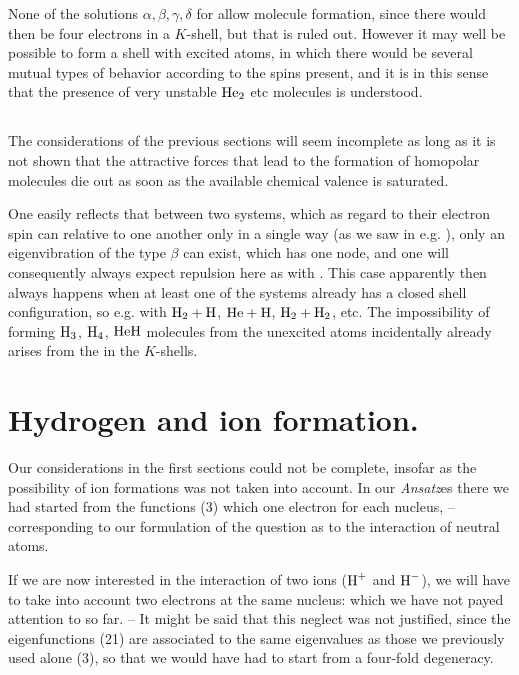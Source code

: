 \begin{paper}{1}
None of the solutions $\alpha,\beta, \gamma, \delta$ for  allow molecule formation, since there would then be four electrons in a $K$-shell, but that is ruled out. However it may well be possible to form a  shell with excited  atoms, in which there would be several mutual types of behavior according to the spins present, and it is in this sense that the presence of very unstable $\text{He}_2$ etc molecules is understood.

\subsection{} The considerations of the previous sections will seem incomplete as long as it is not shown that the attractive forces that lead to the formation of homopolar molecules die out as soon as the available chemical valence is saturated.

One easily reflects that between two systems, which as regard to their electron spin can  relative to one another only in a single way (as we saw in e.g. ), only an eigenvibration of the type $\beta$ can exist, which has one node, and one will consequently always expect repulsion here as with . This case apparently then always happens when at least one of the systems already has a closed shell configuration, so e.g. with $\text{H}_2 + \text{H}$, $\text{He} + \text{H}$, $\text{H}_2 + \text{H}_2$, etc. The impossibility of forming $\text{H}_3$, $\text{H}_4$, $\text{He}\text{H}$ molecules from the unexcited atoms incidentally already arises from the  in the $K$-shells.

\section{Hydrogen and ion formation.} Our considerations in the first sections could not be complete, insofar as the possibility of ion formations was not taken into account. In our \textit{Ansatz}es there we had started from the functions (3)
which  one electron for each nucleus, -- corresponding to our formulation of the question as to the interaction of neutral atoms.

If we are now interested in the interaction of two  ions ($\text{H}^+$ and $\text{H}^-$), we will have to take into account two electrons at the same nucleus:
which we have not payed attention to so far. -- It might be said that this neglect was not justified, since the eigenfunctions (21) are associated to the same eigenvalues as those we previously used alone (3), so that we would have had to start from a four-fold degeneracy.


\end{paper}
